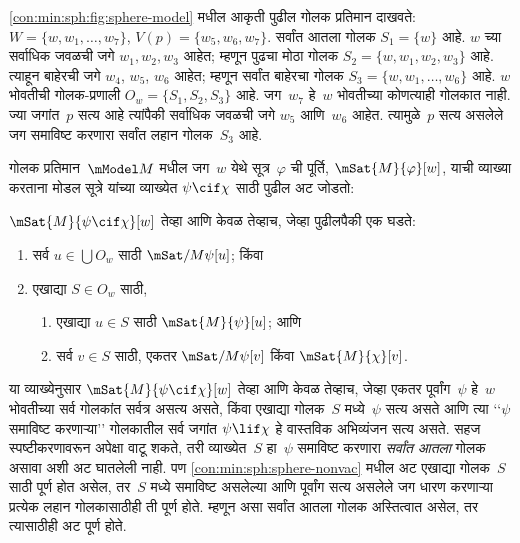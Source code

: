 \ref{con:min:sph:fig:sphere-model} मधील
आकृती पुढील गोलक प्रतिमान
दाखवते: $W = \{w, w_1, \dots, w_7\}$,
$V(p) = \{w_5, w_6,
w_7\}$. सर्वांत आतला गोलक
$S_1 = \{w\}$ आहे.
$w$ च्या सर्वाधिक जवळची
जगे $w_1, w_2, w_3$
आहेत; म्हणून पुढचा मोठा
गोलक $S_2 = \{w, w_1,
w_2, w_3\}$ आहे.
त्याहून बाहेरची जगे
$w_4$, $w_5$, $w_6$
आहेत; म्हणून सर्वांत
बाहेरचा गोलक
$S_3 = \{w, w_1, \dots, w_6\}$
आहे. $w$ भोवतीची
गोलक-प्रणाली
$O_w = \{S_1, S_2, S_3\}$
आहे. जग~$w_7$ हे~$w$
भोवतीच्या कोणत्याही गोलकात
नाही. ज्या जगांत~$p$
सत्य आहे त्यांपैकी
सर्वाधिक जवळची जगे
$w_5$ आणि~$w_6$
आहेत. त्यामुळे~$p$
सत्य असलेले जग
समाविष्ट करणारा सर्वांत
लहान गोलक~$S_3$ आहे.

गोलक प्रतिमान~$\mModel M$
मधील जग~$w$ येथे
सूत्र~$\varphi$ ची पूर्ति,
$\mSat{M}{\varphi}[w]$,
याची व्याख्या करताना
मोडल सूत्रे
यांच्या व्याख्येत
$\psi \cif \chi$
साठी पुढील अट जोडतो:

\begin{defn}
  $\mSat{M}{\psi \cif \chi}[w]$
  तेव्हा आणि केवळ तेव्हाच,
  जेव्हा पुढीलपैकी एक घडते:
  \begin{enumerate}
  \item\label{con:min:sph:sphere-vac}
    सर्व $u \in \bigcup O_w$
    साठी $\mSat/{M}{\psi}[u]$; किंवा
  \item\label{con:min:sph:sphere-nonvac}
    एखाद्या $S \in O_w$ साठी,
    \begin{enumerate}
      \item एखाद्या $u \in
        S$ साठी
        $\mSat{M}{\psi}[u]$; आणि
      \item सर्व $v \in S$
        साठी, एकतर
        $\mSat/{M}{\psi}[v]$
        किंवा
        $\mSat{M}{\chi}[v]$.
    \end{enumerate}
  \end{enumerate}
\end{defn}

या व्याख्येनुसार
$\mSat{M}{\psi \cif \chi}[w]$
तेव्हा आणि केवळ तेव्हाच, जेव्हा
एकतर पूर्वांग~$\psi$
हे~$w$ भोवतीच्या सर्व
गोलकांत सर्वत्र असत्य असते,
किंवा एखाद्या गोलक~$S$
मध्ये~$\psi$ सत्य असते आणि
त्या ‘‘$\psi$ समाविष्ट
करणाऱ्या’’ गोलकातील
सर्व जगांत
$\psi \lif \chi$
हे वास्तविक अभिव्यंजन
सत्य असते.
सहज स्पष्टीकरणावरून
अपेक्षा वाटू शकते,
तरी व्याख्येत~$S$
हा~$\psi$ समाविष्ट
करणारा \emph{सर्वांत
आतला} गोलक असावा
अशी अट घातलेली नाही.
पण \ref{con:min:sph:sphere-nonvac}
मधील अट एखाद्या
गोलक~$S$ साठी
पूर्ण होत असेल,
तर~$S$ मध्ये
समाविष्ट असलेल्या आणि
पूर्वांग सत्य असलेले जग
धारण करणाऱ्या प्रत्येक
लहान गोलकासाठीही
ती पूर्ण होते.
म्हणून असा सर्वांत
आतला गोलक अस्तित्वात
असेल, तर त्यासाठीही
अट पूर्ण होते.

